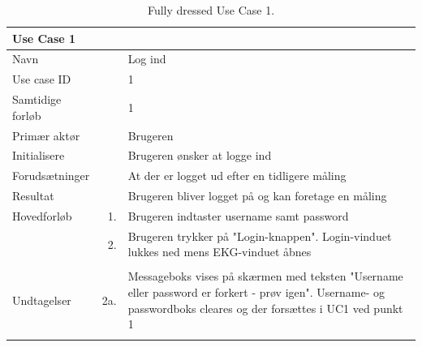 \begin{longtabu} to  %
    {\large \textbf{Use Case 1}} && \\
    \toprule
    Navn &&    Log ind\\
    Use case ID &&    1\\
    Samtidige forløb &&    1\\
    Primær aktør &&    Brugeren\\
    Initialisere &&    Brugeren ønsker at logge ind\\
    Forudsætninger &&  At der er logget ud efter en tidligere måling\\
    Resultat &&    Brugeren bliver logget på og kan foretage en måling                     \\ \midrule
    Hovedforløb &    1. &    Brugeren indtaster username samt password\\[-1ex]   						 	
                &    2. &    Brugeren trykker på "Login-knappen". Login-vinduet lukkes ned mens EKG-vinduet åbnes\\[-1ex]
                &    \\ \midrule
                
    Undtagelser &    2a. & Messageboks vises på skærmen med teksten "Username eller password er forkert - prøv igen". Username- og passwordboks cleares og der forsættes i UC1 ved punkt 1     \\ \bottomrule
\caption{Fully dressed Use Case 1.}
\label{UC1}
\end{longtabu}

